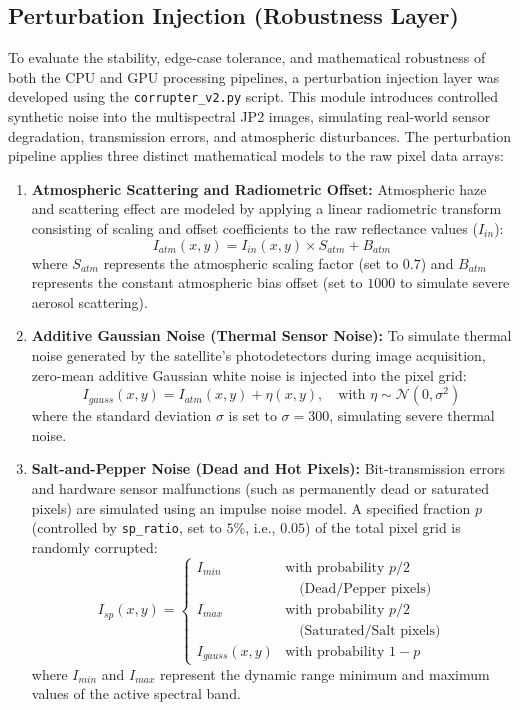 \documentclass[10pt,conference,compsoc]{IEEEtran}
\begin{document}
\subsection{Perturbation Injection (Robustness Layer)}
To evaluate the stability, edge-case tolerance, and mathematical robustness of both the CPU and GPU processing pipelines, a perturbation injection layer was developed using the \texttt{corrupter\_v2.py} script. This module introduces controlled synthetic noise into the multispectral JP2 images, simulating real-world sensor degradation, transmission errors, and atmospheric disturbances. 
The perturbation pipeline applies three distinct mathematical models to the raw pixel data arrays:
\begin{enumerate}
    \item \textbf{Atmospheric Scattering and Radiometric Offset:} 
    Atmospheric haze and scattering effect are modeled by applying a linear radiometric transform consisting of scaling and offset coefficients to the raw reflectance values ($I_{in}$):
    \begin{equation}
    I_{atm}(x, y) = I_{in}(x, y) \times S_{atm} + B_{atm}
    \end{equation}
    where $S_{atm}$ represents the atmospheric scaling factor (set to $0.7$) and $B_{atm}$ represents the constant atmospheric bias offset (set to $1000$ to simulate severe aerosol scattering).
    
    \item \textbf{Additive Gaussian Noise (Thermal Sensor Noise):} 
    To simulate thermal noise generated by the satellite's photodetectors during image acquisition, zero-mean additive Gaussian white noise is injected into the pixel grid:
    \begin{equation}
    I_{gauss}(x, y) = I_{atm}(x, y) + \eta(x, y), \quad \text{with } \eta \sim \mathcal{N}(0, \sigma^2)
    \end{equation}
    where the standard deviation $\sigma$ is set to $\sigma = 300$, simulating severe thermal noise.
    
    \item \textbf{Salt-and-Pepper Noise (Dead and Hot Pixels):} 
    Bit-transmission errors and hardware sensor malfunctions (such as permanently dead or saturated pixels) are simulated using an impulse noise model. A specified fraction $p$ (controlled by \texttt{sp\_ratio}, set to $5\%$, i.e., $0.05$) of the total pixel grid is randomly corrupted:
    \begin{equation}
    I_{sp}(x, y) = 
    \begin{cases} 
      I_{min} & \text{with probability } p/2 \\&\quad \text{(Dead/Pepper pixels)} \\
      I_{max} & \text{with probability } p/2 \\ &\quad \text{(Saturated/Salt pixels)} \\
      I_{gauss}(x, y) & \text{with probability } 1-p 
   \end{cases}
    \end{equation}
    where $I_{min}$ and $I_{max}$ represent the dynamic range minimum and maximum values of the active spectral band.
\end{enumerate}
\end{document}
